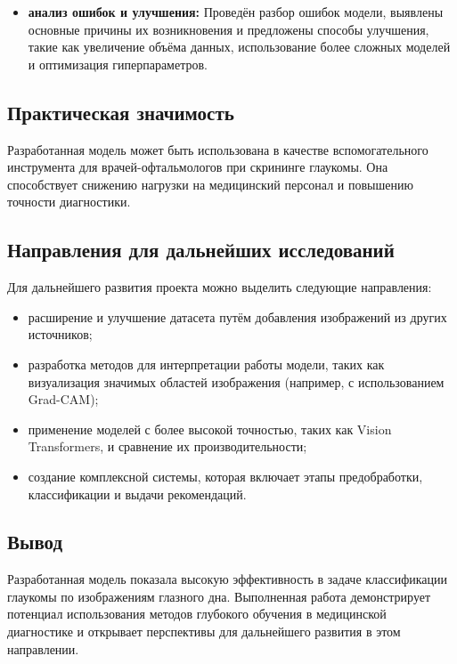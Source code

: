 {\begin{itemize}
        \item \textbf{анализ ошибок и улучшения:} Проведён разбор ошибок модели, выявлены основные причины их возникновения и предложены способы улучшения, такие как увеличение объёма данных, использование более сложных моделей и оптимизация гиперпараметров.

    \end{itemize}

    \subsection*{Практическая значимость}

    Разработанная модель может быть использована в качестве вспомогательного инструмента для врачей-офтальмологов при скрининге глаукомы. Она способствует снижению нагрузки на медицинский персонал и повышению точности диагностики. 

    \subsection*{Направления для дальнейших исследований}

    Для дальнейшего развития проекта можно выделить следующие направления:
    \begin{itemize}
        \item расширение и улучшение датасета путём добавления изображений из других источников;
        \item разработка методов для интерпретации работы модели, таких как визуализация значимых областей изображения (например, с использованием Grad-CAM);
        \item применение моделей с более высокой точностью, таких как Vision Transformers, и сравнение их производительности;
        \item создание комплексной системы, которая включает этапы предобработки, классификации и выдачи рекомендаций.
    \end{itemize}

    \subsection*{Вывод}

    Разработанная модель показала высокую эффективность в задаче классификации глаукомы по изображениям глазного дна. Выполненная работа демонстрирует потенциал использования методов глубокого обучения в медицинской диагностике и открывает перспективы для дальнейшего развития в этом направлении.


}
